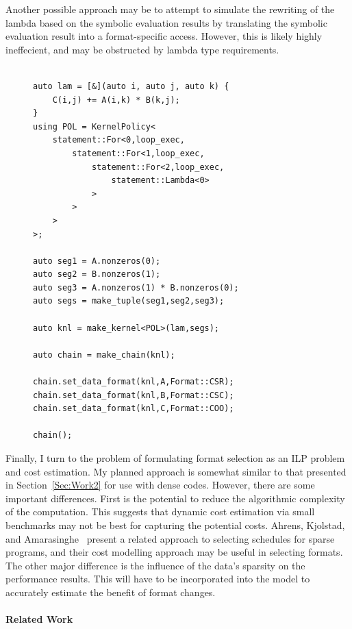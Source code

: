 \documentclass{article}
\begin{document}
Another possible approach may be to attempt to simulate the rewriting of the lambda based on the symbolic evaluation results by translating the symbolic evaluation result into a format-specific access.
However, this is likely highly ineffecient, and may be obstructed by lambda type requirements.


\begin{figure}
\begin{lstlisting}[caption={Possible RAJA implementation of Sparse Matrix Multiply.}, label={SparseMMRaja}]
    
auto lam = [&](auto i, auto j, auto k) {
    C(i,j) += A(i,k) * B(k,j);
}
using POL = KernelPolicy<
    statement::For<0,loop_exec,
        statement::For<1,loop_exec,
            statement::For<2,loop_exec,
                statement::Lambda<0>
            >
        >
    >
>;

auto seg1 = A.nonzeros(0);
auto seg2 = B.nonzeros(1);
auto seg3 = A.nonzeros(1) * B.nonzeros(0);
auto segs = make_tuple(seg1,seg2,seg3);

auto knl = make_kernel<POL>(lam,segs);

auto chain = make_chain(knl);

chain.set_data_format(knl,A,Format::CSR);
chain.set_data_format(knl,B,Format::CSC);
chain.set_data_format(knl,C,Format::COO);

chain();

\end{lstlisting}
\end{figure}

Finally, I turn to the problem of formulating format selection as an ILP problem and cost estimation.
My planned approach is somewhat similar to that presented in Section~\ref{Sec:Work2} for use with dense codes.
However, there are some important differences. 
First is the potential to reduce the algorithmic complexity of the computation. 
This suggests that dynamic cost estimation via small benchmarks may not be best for capturing the potential costs.
Ahrens, Kjolstad, and Amarasinghe~\cite{ahrens2021asymptotic} present a related approach to selecting schedules for sparse programs, and their cost modelling approach may be useful in selecting formats.
The other major difference is the influence of the data's sparsity on the performance results. 
This will have to be incorporated into the model to accurately estimate the benefit of format changes.



\paragraph{Related Work}
\end{document}

